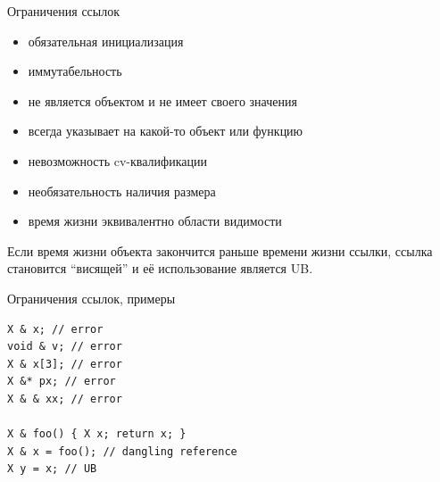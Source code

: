 \documentclass[unknownkeysallowed,xcolor=table]{beamer}
\begin{document}
\begin{frame}[fragile]{Ограничения ссылок}

\begin{itemize}
  \item обязательная инициализация \vspace{0.5em}
  \item иммутабельность \vspace{0.5em}
  \item не является объектом и не имеет своего значения \vspace{0.5em}
  \item всегда указывает на какой-то объект или функцию \vspace{0.5em}
  \item невозможность cv-квалификации \vspace{0.5em}
  \item необязательность наличия размера \vspace{0.5em}
  \item время жизни эквивалентно области видимости
\end{itemize}

\vspace{0.5em}

Если время жизни объекта закончится раньше времени жизни ссылки, ссылка становится ``висящей'' и её использование является UB.

\end{frame}

\begin{frame}[fragile]{Ограничения ссылок, примеры}

\begin{lstlisting}
X & x; // error
void & v; // error
X & x[3]; // error
X &* px; // error
X & & xx; // error

X & foo() { X x; return x; }
X & x = foo(); // dangling reference
X y = x; // UB
\end{lstlisting}

\end{frame}
\end{document}
